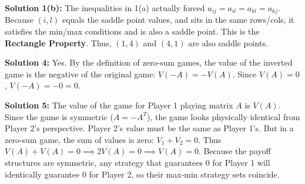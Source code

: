 \documentclass[12pt, a4paper]{article}
\begin{document}
\textbf{Solution 1(b):} The inequalities in 1(a) actually forced $a_{ij} = a_{il} = a_{kl} = a_{kj}$. Because $(i,l)$ equals the saddle point values, and sits in the same rows/cols, it satisfies the min/max conditions and is also a saddle point. This is the \textbf{Rectangle Property}. Thus, $(1,4)$ and $(4,1)$ are also saddle points.

\textbf{Solution 4:} Yes. By the definition of zero-sum games, the value of the inverted game is the negative of the original game: $V(-A) = -V(A)$. Since $V(A) = 0$, $V(-A) = -0 = 0$.

\textbf{Solution 5:} The value of the game for Player 1 playing matrix $A$ is $V(A)$. Since the game is symmetric ($A = -A^T$), the game looks physically identical from Player 2's perspective. Player 2's value must be the same as Player 1's. But in a zero-sum game, the sum of values is zero: $V_1 + V_2 = 0$. 
Thus $V(A) + V(A) = 0 \implies 2V(A) = 0 \implies V(A) = 0$. Because the payoff structures are symmetric, any strategy that guarantees 0 for Player 1 will identically guarantee 0 for Player 2, so their max-min strategy sets coincide.
\end{document}
